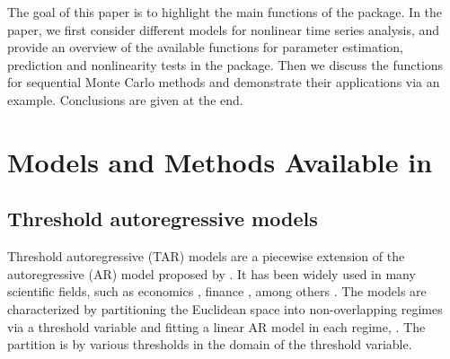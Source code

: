 The goal of this paper is to highlight the main functions of the  package. In the paper, we first consider different models for nonlinear time series analysis, and provide an overview of the available functions for parameter estimation, prediction and nonlinearity tests in the  package. Then we discuss the functions for sequential Monte Carlo methods and demonstrate their applications via an example. Conclusions are given at the end. 



\section{Models and Methods Available in } \label{sec:models}
\subsection{Threshold autoregressive models}
Threshold autoregressive (TAR) models are a piecewise extension of the autoregressive (AR) model proposed by \cite{tong1978}. It has been widely used in many scientific fields, such as economics  \citep{tong1980,tiao1989}, finance \citep{domian1997,narayan2006}, among others \citep{chen1995a}.  The models are characterized by partitioning the Euclidean space into non-overlapping regimes
via a threshold variable and fitting a linear AR model in each regime, \cite{li2016}. The
partition is by various thresholds in the domain of the threshold variable.

